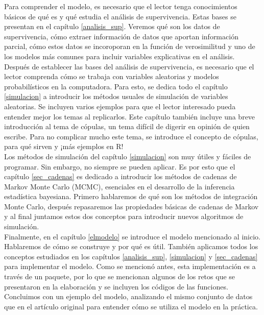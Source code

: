 \documentclass[11pt,a4paper]{article}
\begin{document}
Para comprender el modelo, es necesario que el lector tenga conocimientos básicos de qué es y qué estudia el análisis de supervivencia. Estas bases se presentan en el capítulo \ref{analisis_sup}. Veremos qué son los datos de supervivencia, cómo extraer información de datos que aportan información parcial, cómo estos datos se incoroporan en la función de verosimilitud y uno de los modelos más comunes para incluir variables explicativas en el análisis.\\

Después de establecer las bases del análisis de supervivencia, es necesario que el lector comprenda cómo se trabaja con variables aleatorias y modelos probabilísticos en la computadora. Para esto, se dedica todo el capítulo \ref{simulacion} a introducir los métodos usuales de simulación de variables aleatorias. Se incluyen varios ejemplos para que el lector interesado pueda entender mejor los temas al replicarlos. Este capítulo también incluye una breve introducción al tema de cópulas, un tema difícil de digerir en opinión de quien escribe. Para no complicar mucho este tema, se introduce el concepto de cópulas, para qué sirven y ¡más ejemplos en R!\\

Los métodos de simulación del capítulo \ref{simulacion} son muy útiles y fáciles de programar. Sin embargo, no siempre se pueden aplicar. Es por esto que el capítulo \ref{sec_cadenas} es dedicado a introducir los métodos de cadenas de Markov Monte Carlo (MCMC), esenciales en el desarrollo de la inferencia estadística bayesiana. Primero hablaremos de qué son los métodos de integración Monte Carlo, después repasaremos las propiedades básicas de cadenas de Markov y al final juntamos estos dos conceptos para introducir nuevos algoritmos de simulación.\\

Finalmente, en el capítulo \ref{elmodelo} se introduce el modelo mencionado al inicio. Hablaremos de cómo se construye y por qué es útil. También aplicamos todos los conceptos estudiados en los capítulos \ref{analisis_sup}, \ref{simulacion} y \ref{sec_cadenas} para implementar el modelo. Como se mencionó antes, esta implementación es a través de un paquete, por lo que se mencionan algunos de los retos que se presentaron en la elaboración y se incluyen los códigos de las funciones. Concluimos con un ejemplo del modelo, analizando el mismo conjunto de datos que en el artículo original \citep{nieto} para entender cómo se utiliza el modelo en la práctica.\\
\end{document}

